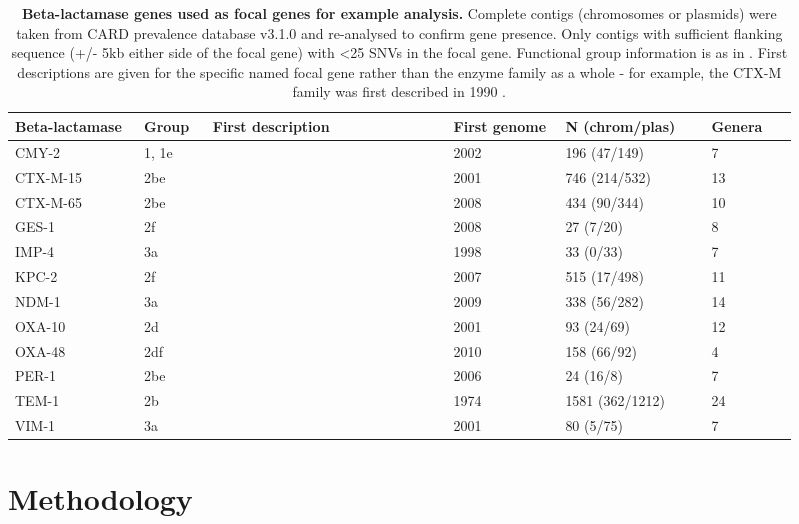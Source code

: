 \documentclass[rmp,superscriptaddress,11pt]{revtex4-1}
\begin{document}
\begin{table*}
\begin{small}
\begin{tabular}{p{0.15\linewidth}p{0.08\linewidth}p{0.28\linewidth}p{0.13\linewidth}p{0.17\linewidth}p{0.1\linewidth}}
 \textbf{Beta-lactamase} & \textbf{Group} & \textbf{First description} & \textbf{First genome} & \textbf{N (chrom/plas)} & \textbf{Genera}\\\hline
 CMY-2 & 1, 1e & \textcite{pmid2079378} & 2002 & 196 (47/149) & 7 \\
 CTX-M-15 & 2be & \textcite{pmid11470367}& 2001 & 746 (214/532) & 13\\
 CTX-M-65 & 2be & \textcite{pmid19073302} & 2008 & 434 (90/344) & 10 \\
 GES-1 & 2f & \textcite{pmid10681329} & 2008 & 27 (7/20) & 8 \\
 IMP-4 & 3a &  \textcite{pmid8141584}& 1998 & 33 (0/33) & 7 \\
 KPC-2 & 2f &  \textcite{pmid11257029} & 2007 & 515 (17/498) & 11 \\
 NDM-1 & 3a & \textcite{pmid19770275} & 2009 & 338 (56/282) & 14 \\
 OXA-10 & 2d & \textcite{pmid3126705} & 2001 & 93 (24/69) & 12 \\
 OXA-48 & 2df & \textcite{pmid14693513} & 2010 & 158 (66/92) & 4 \\
 PER-1 & 2be & \textcite{pmid8517722} & 2006 & 24 (16/8) & 7 \\
 TEM-1 & 2b & \textcite{pmid5326330} & 1974 & 1581 (362/1212) & 24 \\
 VIM-1 & 3a & \textcite{pmid10390207}  & 2001 & 80 (5/75) & 7\\
\end{tabular}
\end{small}
\caption{\textbf{Beta-lactamase genes used as focal genes for example analysis.} Complete contigs (chromosomes or plasmids) were taken from CARD prevalence database v3.1.0 and re-analysed to confirm gene presence. Only contigs with sufficient flanking sequence (+/- 5kb either side of the focal gene) with <25 SNVs in the focal gene. Functional group information is as in \textcite{Bush2010}. First descriptions are given for the specific named focal gene rather than the enzyme family as a whole - for example, the CTX-M family was first described in 1990 \cite{pmid2079378}.}
\label{table:bl-genes}
\end{table*}

\pagebreak 

\section{Methodology}
\end{document}
